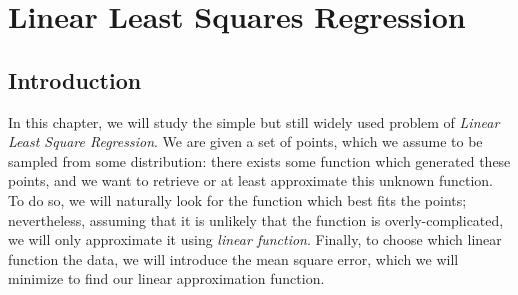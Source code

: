 \documentclass[toc, titlepaged]{../cs-classes/cs-classes}
\begin{document}
%
%    
%
%    
%

\section{Linear Least Squares Regression}
\subsection{Introduction}
In this chapter, we will study the simple but still widely used problem of \emph{Linear Least Square Regression}. We are given a set of points, which we assume to be sampled from some distribution: there exists some function which generated these points, and we want to retrieve or at least approximate this unknown function. To do so, we will naturally look for the function which best fits the points; nevertheless, assuming that it is unlikely that the function is overly-complicated, we will only approximate it using \emph{linear function}. Finally, to choose which linear function  the data, we will introduce the mean square error, which we will minimize to find our linear approximation function.
\end{document}

